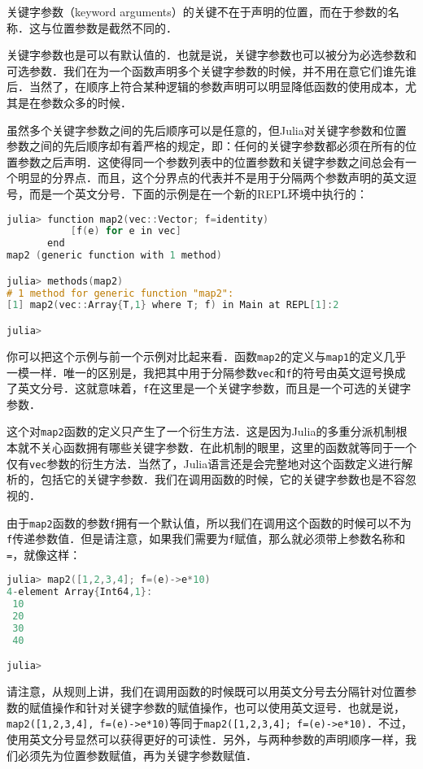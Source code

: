 关键字参数（keyword arguments）的关键不在于声明的位置，而在于参数的名称．这与位置参数是截然不同的．

关键字参数也是可以有默认值的．也就是说，关键字参数也可以被分为必选参数和可选参数．我们在为一个函数声明多个关键字参数的时候，并不用在意它们谁先谁后．当然了，在顺序上符合某种逻辑的参数声明可以明显降低函数的使用成本，尤其是在参数众多的时候．

虽然多个关键字参数之间的先后顺序可以是任意的，但Julia对关键字参数和位置参数之间的先后顺序却有着严格的规定，即：任何的关键字参数都必须在所有的位置参数之后声明．这使得同一个参数列表中的位置参数和关键字参数之间总会有一个明显的分界点．而且，这个分界点的代表并不是用于分隔两个参数声明的英文逗号，而是一个英文分号．下面的示例是在一个新的REPL环境中执行的：

\begin{lstlisting}[language=cpp]
julia> function map2(vec::Vector; f=identity)
           [f(e) for e in vec]
       end
map2 (generic function with 1 method)

julia> methods(map2)
# 1 method for generic function "map2":
[1] map2(vec::Array{T,1} where T; f) in Main at REPL[1]:2

julia> 
\end{lstlisting}

你可以把这个示例与前一个示例对比起来看．函数\verb|map2|的定义与\verb|map1|的定义几乎一模一样．唯一的区别是，我把其中用于分隔参数\verb|vec|和\verb|f|的符号由英文逗号换成了英文分号．这就意味着，\verb|f|在这里是一个关键字参数，而且是一个可选的关键字参数．

这个对\verb|map2|函数的定义只产生了一个衍生方法．这是因为Julia的多重分派机制根本就不关心函数拥有哪些关键字参数．在此机制的眼里，这里的函数就等同于一个仅有\verb|vec|参数的衍生方法．当然了，Julia语言还是会完整地对这个函数定义进行解析的，包括它的关键字参数．我们在调用函数的时候，它的关键字参数也是不容忽视的．

由于\verb|map2|函数的参数\verb|f|拥有一个默认值，所以我们在调用这个函数的时候可以不为\verb|f|传递参数值．但是请注意，如果我们需要为\verb|f|赋值，那么就必须带上参数名称和\verb|=|，就像这样：

\begin{lstlisting}[language=cpp]
julia> map2([1,2,3,4]; f=(e)->e*10)
4-element Array{Int64,1}:
 10
 20
 30
 40

julia>
\end{lstlisting}

请注意，从规则上讲，我们在调用函数的时候既可以用英文分号去分隔针对位置参数的赋值操作和针对关键字参数的赋值操作，也可以使用英文逗号．也就是说，\verb|map2([1,2,3,4], f=(e)->e*10)|等同于\verb|map2([1,2,3,4]; f=(e)->e*10)|．不过，使用英文分号显然可以获得更好的可读性．另外，与两种参数的声明顺序一样，我们必须先为位置参数赋值，再为关键字参数赋值．

